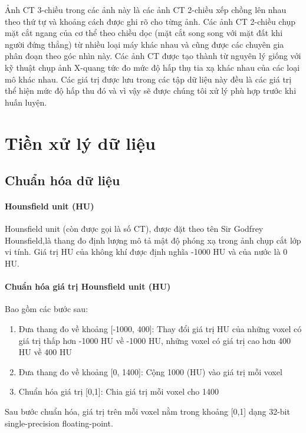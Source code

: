 Ảnh CT 3-chiều trong các ảnh này là các ảnh CT 2-chiều xếp chồng lên nhau theo thứ tự và khoảng cách được ghi rõ cho từng ảnh. Các ảnh CT 2-chiều chụp mặt cắt ngang của cơ thể theo chiều dọc (mặt cắt song song với mặt đất khi người đứng thẳng) từ nhiều loại máy khác nhau và cũng được các chuyên gia phân đoạn theo góc nhìn này. Các ảnh CT được tạo thành từ nguyên lý giống với kỹ thuật chụp ảnh X-quang tức đo mức độ hấp thụ tia xạ khác nhau của các loại mô khác nhau. Các giá trị được lưu trong các tập dữ liệu này đều là các giá trị thể hiện mức độ hấp thu đó và vì vậy sẽ được chúng tôi xử lý phù hợp trước khi huấn luyện.

\section{Tiền xử lý dữ liệu}
\subsection{Chuẩn hóa dữ liệu}
\paragraph{Hounsfield unit (HU)} Hounsfield unit (còn được gọi là số CT), được đặt theo tên Sir Godfrey Hounsfield,là thang đo định lượng mô tả mật độ phóng xạ trong ảnh chụp cắt lớp vi tính. Giá trị HU của không khí được định nghĩa -1000 HU và của nước là 0 HU.
\paragraph{Chuẩn hóa giá trị Hounsfield unit (HU)} Bao gồm các bước sau:
\begin{enumerate}
\item Đưa thang đo về khoảng [-1000, 400]: Thay đổi giá trị HU của những voxel có giá trị thấp hơn -1000 HU về -1000 HU, những voxel có giá trị cao hơn 400 HU về 400 HU
\item Đưa thang đo về khoảng [0, 1400]: Cộng 1000 (HU) vào giá trị mỗi voxel
\item Chuẩn hóa giá trị [0,1]: Chia giá trị mỗi voxel cho 1400
\end{enumerate}
Sau bước chuẩn hóa, giá trị trên mỗi voxel nằm trong khoảng [0,1] dạng 32-bit single-precision floating-point.

